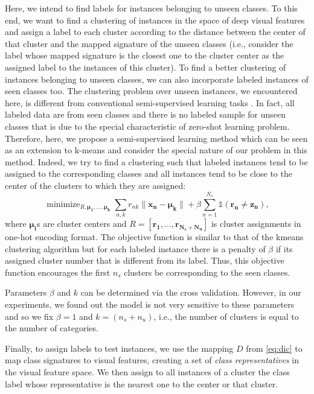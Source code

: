 \documentclass[10pt,twocolumn,letterpaper]{article}
\DeclareMathOperator*{\minimize}{minimize}
\begin{document}
Here, we intend to find labels for instances belonging to unseen classes. To this end, we want to find a clustering of instances in the space of deep visual features and assign a label to each cluster according to the distance between the center of that cluster and the mapped signature of the unseen classes (i.e., consider the label whose mapped signature is the closest one to the cluster center as the assigned label to the instances of this cluster). To find a better clustering of instances belonging to unseen classes, we can also incorporate labeled instances of seen classes too. The clustering problem over unseen instances, we encountered here, is different from conventional semi-supervised learning tasks \cite{}.
In fact, all labeled data are from seen classes and there is no labeled sample for unseen classes that is due to the special characteristic of zero-shot learning problem. Therefore, here, we propose a semi-supervised learning method which
can be seen as an extension to k-means and consider the special nature of our problem in this method. Indeed, we try to find a clustering such that labeled instances tend to be assigned to the corresponding classes and all instances tend to be close to the center of the clusters to which they are assigned:
\begin{equation}
\minimize_{R, \mathbf{\mu_1, \ldots, \mu_k }}  \sum_{n,k} r_{nk} \lVert \mathbf{x_n - \mu_k} \rVert +
 \beta \sum_{n=1}^{N_s} \mathds{1}(\mathbf{r_n \neq z_n}),
\end{equation}
where $\mathbf{\mu_i}$s are cluster centers and $R = [\mathbf{r_1, \ldots, r_{N_s + N_u }} ]$ is cluster assignments in one-hot encoding format.
The objective function is similar to that of the kmeans clustering algorithm but for each labeled instance there is a penalty of $\beta$ if its assigned cluster number that is different from its label. Thus, this objective function encourages
the first $n_s$ clusters be corresponding to the seen classes.

Parameters $\beta$ and $k$ can be determined via the cross validation. However, in our experiments, we found out
the model is not very sensitive to these parameters and so we fix $\beta=1$ and $k =  (n_s + n_u)$, i.e., the number of clusters is equal to the number of categories.

Finally, to assign labels to test instances, we use the mapping $D$ from \eqref{eq:dic} to map class signatures to visual features, creating a set of \textit{class representatives} in the visual feature space. We then assign to all instances of a cluster the class label whose representative is the nearest one to the center or that cluster.
\end{document}
